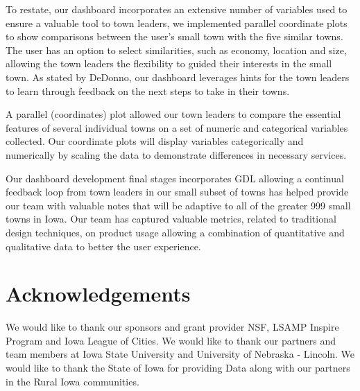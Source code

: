 \documentclass[10pt]{article}\usepackage[]{graphicx}\usepackage[]{color}
\begin{document}
To restate, our dashboard incorporates an extensive number of variables used to ensure a valuable tool to town leaders, we implemented parallel coordinate plots to show comparisons between the user's small town with the five similar towns. The user has an option to select similarities, such as economy, location and size, allowing the town leaders the flexibility to guided their interests in the small town. As stated by DeDonno, our dashboard leverages hints for the town leaders to learn through feedback on the next steps to take in their towns.

A parallel (coordinates) plot allowed our town leaders to compare the essential features of several individual towns on a set of numeric and categorical variables collected. Our coordinate plots will display variables categorically and numerically by scaling the data to demonstrate differences in necessary services.

Our dashboard development final stages incorporates GDL allowing a continual feedback loop from town leaders in our small subset of towns has helped provide our team with valuable notes that will be adaptive to all of the greater 999 small towns in Iowa. Our team has captured valuable metrics, related to traditional design techniques, on product usage allowing a combination of quantitative and qualitative data to better the user experience. %


\section{Acknowledgements}
We would like to thank our sponsors and grant provider NSF, LSAMP Inspire Program and Iowa League of Cities. We would like to thank our partners and team members at Iowa State University and University of Nebraska - Lincoln. We would like to thank the State of Iowa for providing Data along with our partners in the Rural Iowa communities.



\end{document}
